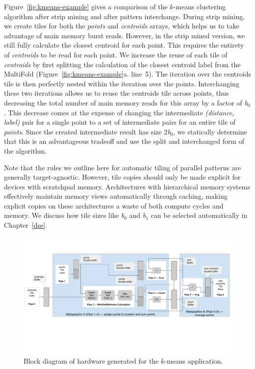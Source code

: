 Figure~\ref{fig:kmeans-example} gives a comparison of the $k$-means clustering
algorithm after strip mining and after pattern interchange. During strip mining,
we create tiles for both the \emph{points} and \emph{centroids} arrays, which
helps us to take advantage of main memory burst reads. However, in the strip
mined version, we still fully calculate the closest centroid for each point.
This requires the entirety of \emph{centroids} to be read for each point.
We increase the reuse of each tile of \emph{centroids} by first splitting
the calculation of the closest centroid label from the MultiFold
(Figure~\ref{fig:kmeans-example}a. line~5). The iteration over the centroids
tile is then perfectly nested within the iteration over the points.
Interchanging these two iterations allows us to reuse the centroids tile across
points, thus decreasing the total number of main memory reads for this array
by a factor of \emph{b$_0$}. This decrease comes
at the expense of changing the intermediate \emph{(distance, label)} pair for a single
point to a set of intermediate pairs for an entire tile of \emph{points}.
Since the created intermediate result
has size 2\emph{b$_0$}, we statically determine that this is an advantageous
tradeoff and use the split and interchanged form of the algorithm.

Note that the rules we outline here for automatic tiling of parallel patterns are
generally target-agnostic. However, tile copies should only be made explicit for devices
with scratchpad memory. Architectures with hierarchical memory systems
effectively maintain memory views automatically through
caching, making explicit copies on these architectures a waste of both
compute cycles and memory. We discuss how tile sizes like \emph{b$_0$} and
\emph{b$_1$} can be selected automatically in Chapter~\ref{dse}.

\begin{figure}
\centering
\includegraphics[width=6in]{3-delite/figs/kmeans-blockdiagram.pdf}
\caption{Block diagram of hardware generated for the $k$-means application.}
\label{fig:metapipelining}
\end{figure}

